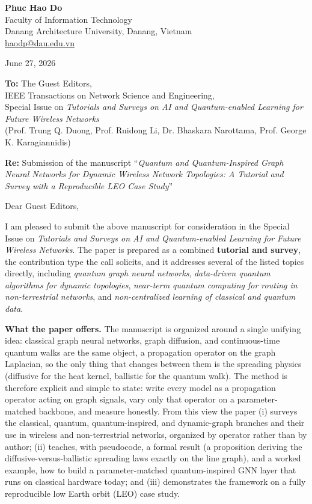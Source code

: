 \documentclass[11pt]{article}
\begin{document}
\thispagestyle{empty}

\noindent\textbf{Phuc Hao Do}\\
Faculty of Information Technology\\
Danang Architecture University, Danang, Vietnam\\
\href{mailto:haodp@dau.edu.vn}{haodp@dau.edu.vn}

\vspace{1.2em}
\noindent June 27, 2026

\vspace{1.2em}
\noindent\textbf{To:} The Guest Editors,\\
IEEE Transactions on Network Science and Engineering,\\
Special Issue on \emph{Tutorials and Surveys on AI and Quantum-enabled Learning for
Future Wireless Networks}\\
(Prof. Trung Q. Duong, Prof. Ruidong Li, Dr. Bhaskara Narottama, Prof. George K.
Karagiannidis)

\vspace{1.0em}
\noindent\textbf{Re:} Submission of the manuscript ``\emph{Quantum and Quantum-Inspired
Graph Neural Networks for Dynamic Wireless Network Topologies: A Tutorial and Survey with
a Reproducible LEO Case Study}''

\vspace{1.2em}
\noindent Dear Guest Editors,

I am pleased to submit the above manuscript for consideration in the Special Issue on
\emph{Tutorials and Surveys on AI and Quantum-enabled Learning for Future Wireless
Networks}. The paper is prepared as a combined \textbf{tutorial and survey}, the
contribution type the call solicits, and it addresses several of the listed topics
directly, including \emph{quantum graph neural networks}, \emph{data-driven quantum
algorithms for dynamic topologies}, \emph{near-term quantum computing for routing in
non-terrestrial networks}, and \emph{non-centralized learning of classical and quantum
data}.

\textbf{What the paper offers.} The manuscript is organized around a single unifying idea:
classical graph neural networks, graph diffusion, and continuous-time quantum walks are
the same object, a propagation operator on the graph Laplacian, so the only thing that
changes between them is the spreading physics (diffusive for the heat kernel, ballistic
for the quantum walk). The method is therefore explicit and simple to state: write every
model as a propagation operator acting on graph signals, vary only that operator on a
parameter-matched backbone, and measure honestly. From this view the paper (i) surveys
the classical, quantum, quantum-inspired, and dynamic-graph branches and their use in
wireless and non-terrestrial networks, organized by operator rather than by author; (ii)
teaches, with pseudocode, a formal result (a proposition deriving the diffusive-versus-ballistic
spreading laws exactly on the line graph), and a worked example, how to build a
parameter-matched quantum-inspired GNN layer that runs on classical hardware today; and
(iii) demonstrates the framework on a fully reproducible low Earth orbit (LEO) case study.
\end{document}
